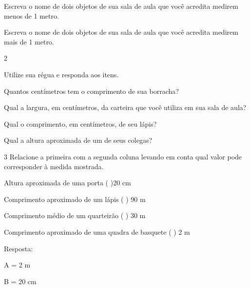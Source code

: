 \begin{escolha}
\begin{escolha}

\item
  Escreva o nome de dois objetos de sua sala de aula que você acredita
  medirem menos de 1 metro.

\item
  Escreva o nome de dois objetos de sua sala de aula que você acredita
  medirem mais de 1 metro.

\end{escolha}

\num{2}

Utilize sua régua e responda aos itens.

\begin{escolha}

\item
  Quantos centímetros tem o comprimento de sua borracha?

\item
  Qual a largura, em centímetros, da carteira que você utiliza em sua
  sala de aula?

\item
  Qual o comprimento, em centímetros, de seu lápis?

\item
  Qual a altura aproximada de um de seus colegas?

\end{escolha}

\num{3} Relacione a primeira com a segunda coluna levando em conta qual valor
pode corresponder à medida mostrada.

\begin{escolha}

\item
  Altura aproximada de uma porta ( )20 cm
\item
  Comprimento aproximado de um lápis ( ) 90 m
\item
  Comprimento médio de um quarteirão ( ) 30 m
\item
  Comprimento aproximado de uma quadra de basquete ( ) 2 m

\end{escolha}

Resposta:

A = 2 m

B = 20 cm


\end{escolha}
